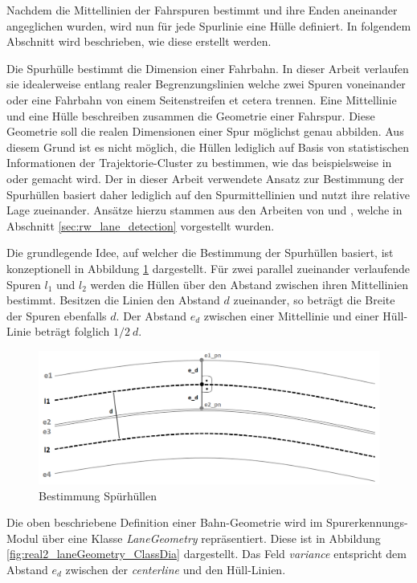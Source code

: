 Nachdem die Mittellinien der Fahrspuren bestimmt und ihre Enden aneinander angeglichen wurden, wird nun für jede Spurlinie
eine Hülle definiert. In folgendem Abschnitt wird beschrieben, wie diese erstellt werden.

Die Spurhülle bestimmt die Dimension einer Fahrbahn. In dieser Arbeit verlaufen sie idealerweise entlang
realer Begrenzungslinien welche zwei Spuren voneinander oder eine Fahrbahn von einem Seitenstreifen et cetera trennen.
Eine Mittellinie und eine Hülle beschreiben zusammen die Geometrie einer Fahrspur. Diese Geometrie
soll die realen Dimensionen einer Spur möglichst genau abbilden. Aus diesem Grund ist es nicht möglich,
die Hüllen lediglich auf Basis von statistischen Informationen der Trajektorie-Cluster zu bestimmen,
wie das beispielsweise in \cite[]{WeimingHu2006} oder \cite[]{Morris2011} gemacht wird.
Der in dieser Arbeit verwendete Ansatz zur Bestimmung der Spurhüllen basiert daher lediglich auf den
Spurmittellinien und nutzt ihre relative Lage zueinander. Ansätze hierzu stammen aus den Arbeiten von
\cite[]{Hsieh2006} und \cite[]{Makris2005}, welche in Abschnitt \ref{sec:rw_lane_detection} vorgestellt wurden.

Die grundlegende Idee, auf welcher die Bestimmung der Spurhüllen basiert, ist konzeptionell in Abbildung
\ref{fig:real2_envelope_definition_concept} dargestellt.
Für zwei parallel zueinander verlaufende Spuren $l_1$ und $l_2$ werden die Hüllen über den Abstand zwischen
ihren Mittellinien bestimmt. Besitzen die Linien den Abstand $d$ zueinander, so beträgt die Breite
der Spuren ebenfalls $d$. Der Abstand $e_d$ zwischen einer Mittellinie und einer Hüll-Linie beträgt folglich
$1/2\ d$.

\begin{figure}[H]
    \centering
    \includegraphics[width=0.75\linewidth]{../resources/img/umsetzung/U2/concept_lane_envelope}
    \caption{Bestimmung Spürhüllen}
    \label{fig:real2_envelope_definition_concept}
\end{figure}

Die oben beschriebene Definition einer Bahn-Geometrie wird im Spurerkennungs-Modul über eine Klasse
\textit{LaneGeometry} repräsentiert. Diese ist in Abbildung \ref{fig:real2_laneGeometry_ClassDia} dargestellt.
Das Feld \textit{variance} entspricht dem Abstand $e_d$ zwischen der \textit{centerline} und den Hüll-Linien.

